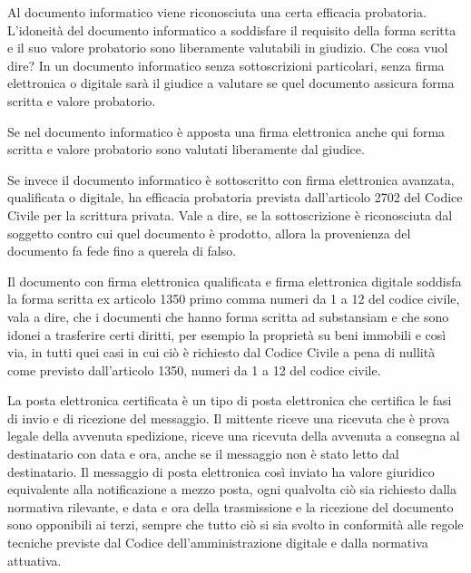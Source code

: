 Al documento informatico viene riconosciuta una certa efficacia probatoria.
L'idoneità del documento informatico a soddisfare il requisito della forma scritta e il suo valore probatorio sono liberamente valutabili in giudizio. Che cosa vuol dire? In un documento informatico senza sottoscrizioni particolari, senza firma elettronica o digitale sarà il giudice a valutare se quel documento assicura forma scritta e valore probatorio. 

Se nel documento informatico è apposta una firma elettronica anche qui forma scritta e valore probatorio sono valutati liberamente dal giudice. 

Se invece il documento informatico è sottoscritto con firma elettronica avanzata, qualificata o digitale, ha efficacia probatoria prevista dall'articolo 2702 del Codice Civile per la scrittura privata. Vale a dire, se la sottoscrizione è riconosciuta dal soggetto contro cui quel documento è prodotto, allora la provenienza del documento fa fede fino a querela di falso. 

Il documento con firma elettronica qualificata e firma elettronica digitale soddisfa la forma scritta ex articolo 1350 primo comma numeri da 1 a 12 del codice civile, vala a dire, che i documenti che hanno forma scritta ad substansiam e che sono idonei a trasferire certi diritti, per esempio la proprietà su beni immobili e così via, in tutti quei casi in cui ciò è richiesto dal Codice Civile a pena di nullità come previsto dall'articolo 1350, numeri da 1 a 12 del codice civile. 

La posta elettronica certificata è un tipo di posta elettronica che certifica le fasi di invio e di ricezione del messaggio. Il mittente riceve una ricevuta che è prova legale della avvenuta spedizione, riceve una ricevuta della avvenuta a consegna al destinatario con data e ora, anche se il messaggio non è stato letto dal destinatario. Il messaggio di posta elettronica così inviato ha valore giuridico equivalente alla notificazione a mezzo posta, ogni qualvolta ciò sia richiesto dalla normativa rilevante, e data e ora della trasmissione e la ricezione del documento sono opponibili  ai terzi, sempre che tutto ciò si sia svolto in conformità alle regole tecniche previste dal Codice dell'amministrazione digitale e dalla normativa attuativa.